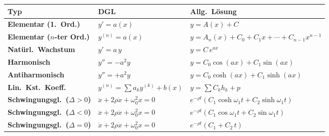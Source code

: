 \documentclass[../../zusammenfassung_AN.tex]{subfiles}
\begin{document}
	\renewcommand{\arraystretch}{1.5}
	\begin{tabular}{>{\bfseries}p{4.0cm} p{3.8cm} p{7cm}}
		\toprule
		\textbf{Typ} & \textbf{DGL} & \textbf{Allg.\ Lösung} \\
		\midrule
		Elementar (1.\ Ord.)       & $y'=a(x)$                         & $y=A(x)+C$ \\
		Elementar ($n$-ter Ord.)   & $y^{(n)}=a(x)$                    & $y=A_n(x)+C_0+C_1 x+\cdots+C_{n-1}x^{n-1}$ \\
		Natürl.\ Wachstum          & $y'=a\,y$                         & $y=C\,e^{ax}$ \\
		Harmonisch                 & $y''=-a^2 y$                      & $y=C_0\cos(ax)+C_1\sin(ax)$ \\
		Antiharmonisch             & $y''=+a^2 y$                      & $y=C_0\cosh(ax)+C_1\sinh(ax)$ \\
		Lin.\ Kst.\ Koeff.         & $y^{(n)}=\sum a_k y^{(k)}+b(x)$  & $y=\sum C_k h_k+p$ \\
		Schwingungsgl.\ ($\Delta>0$) & $\ddot x+2\rho\dot x+\omega_0^2 x=0$ & $e^{-\rho t}(C_1\cosh\omega_1 t+C_2\sinh\omega_1 t)$ \\
		Schwingungsgl.\ ($\Delta<0$) & $\ddot x+2\rho\dot x+\omega_0^2 x=0$ & $e^{-\rho t}(C_1\cos\omega_1 t+C_2\sin\omega_1 t)$ \\
		Schwingungsgl.\ ($\Delta=0$) & $\ddot x+2\rho\dot x+\omega_0^2 x=0$ & $e^{-\rho t}(C_1+C_2\,t)$ \\
		\bottomrule
	\end{tabular}
	
\end{document}
